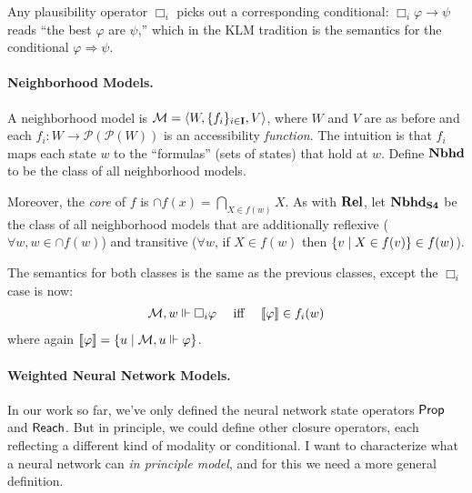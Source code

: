 \documentclass[letterpaper]{article}
\begin{document}
Any plausibility operator $\Box_i$ picks out a corresponding conditional: $\Box_i \varphi \to \psi$ reads ``the best $\varphi$ are $\psi$,'' which in the KLM tradition is the semantics for the conditional $\varphi \Rightarrow \psi$.

\paragraph*{Neighborhood Models.} A neighborhood model is $\mathcal{M} = \langle W, \{ f_i \}_{i \in \textbf{I}}, V \rangle$, where $W$ and $V$ are as before and each $f_i : W \to \mathcal{P}(\mathcal{P}(W))$ is an accessibility \emph{function}.  The intuition is that $f_i$ maps each state $w$ to the ``formulas'' (sets of states) that hold at $w$.  Define $\textrm{\textbf{Nbhd}}$ to be the class of all neighborhood models.  

Moreover, the \emph{core} of $f$ is $\cap f(x) = \bigcap_{X \in f(w)} X$.  As with $\textrm{\textbf{Rel}}$, let $\textrm{\textbf{Nbhd}}_\textrm{\textbf{S4}}$ be the class of all neighborhood models that are additionally reflexive ($\forall w, w \in \cap f(w)$) and transitive ($\forall w$, if $X \in f(w)$ then $\{ v \mid X \in f(v) \} \in f(w)$).

The semantics for both classes is the same as the previous classes, except the $\Box_i$ case is now:
\[
\begin{array}{lcl}
    \mathcal{M}, w \Vdash \Box_i \varphi & \mbox{ iff } & [\![\mbox{\em $ \varphi $\/}]\!] \in f_i(w)
\end{array}
\]
where again $[\![\mbox{\em $ \varphi $\/}]\!] = \{ u \mid \mathcal{M}, u \Vdash \varphi \}$.

\paragraph*{Weighted Neural Network Models.} 
In our work \cite{kisby2024hebbian} so far, we've only defined the neural network state operators $\mathsf{Prop}$ and $\mathsf{Reach}$.  But in principle, we could define other closure operators, each reflecting a different kind of modality or conditional.  I want to characterize what a neural network  can \emph{in principle model}, and for this we need a more general definition.
\end{document}
